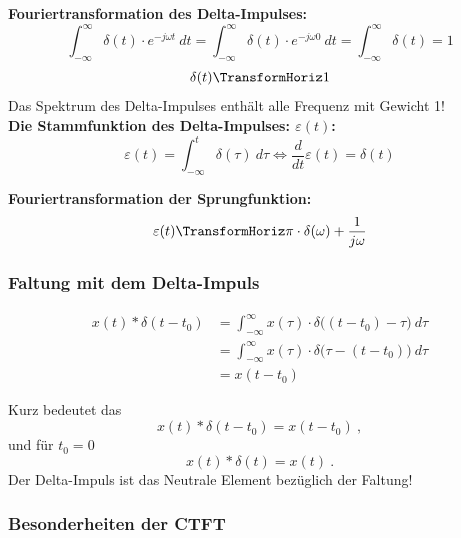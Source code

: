 \documentclass[12pt,a4paper]{scrartcl}
\begin{document}
    \noindent \textbf{Fouriertransformation des Delta-Impulses:}
    $$\int_{-\infty}^{\infty} \delta(t) \cdot e^{-j\omega t}\ dt = \int_{-\infty}^{\infty} \delta(t) \cdot e^{-j\omega 0}\ dt = \int_{-\infty}^{\infty} \delta(t) = 1$$
    $$\delta(t) \TransformHoriz 1 $$ 
    Das Spektrum des Delta-Impulses enthält alle Frequenz mit Gewicht 1! \\

    \noindent \textbf{Die Stammfunktion des Delta-Impulses: $\varepsilon(t)$:}
    $$\varepsilon (t) = \int_{-\infty}^{t} \delta(\tau)\ d \tau \Leftrightarrow  \frac{d}{dt} \varepsilon (t) = \delta (t) $$

     \noindent \textbf{Fouriertransformation der Sprungfunktion:}
     $$\varepsilon(t) \TransformHoriz \pi \cdot \delta(\omega) + \frac{1}{j\omega} $$

  \subsubsection{Faltung mit dem Delta-Impuls}
  \label{sec:sub:sub:faltung-mit-delta-impuls}

  \begin{equation}
    \label{eq:10}
    \begin{split}
    x(t) * \delta(t-t_0) &= \int_{-\infty}^{\infty} x(\tau) \cdot \delta\big((t-t_0) - \tau\big)\ d \tau  \\
    &= \int_{-\infty}^{\infty} x(\tau) \cdot \delta \big(\tau -(t-t_0)\big)\ d \tau \\    
    &=x(t - t_0)
    \end{split}
    \end{equation}

\noindent    Kurz bedeutet das
    $$x(t) * \delta(t-t_0) = x(t-t_0)\ ,$$
    und für $t_0 = 0$
    $$x(t) * \delta(t) = x(t)\ .$$
    \noindent Der Delta-Impuls ist das Neutrale Element bezüglich der Faltung!

  \subsubsection{Besonderheiten der CTFT}
  \label{sec:sub:sub:besonderheiten-ctft}
\end{document}
